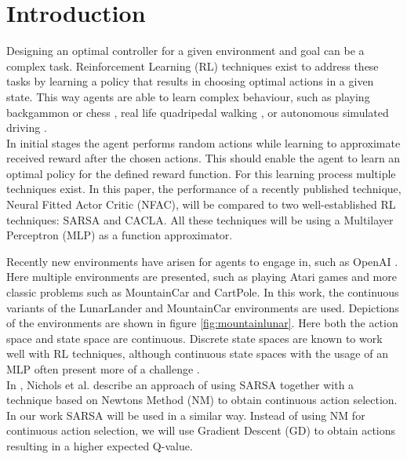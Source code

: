 
\section{Introduction}

Designing an optimal controller for a given environment and goal can be a complex task. Reinforcement Learning (RL) techniques exist to address these tasks by learning a policy that results in choosing optimal actions in a given state. This way agents are able to learn complex behaviour, such as playing backgammon \cite{tesauro2002programming} or chess \cite{baxter1999knightcap},
real life quadripedal walking \cite{kohl2004policy}, or autonomous simulated driving \cite{}. \\  %


In initial stages the agent performs random actions while learning to approximate received reward after the chosen actions. This should enable the agent to learn an optimal policy for the defined reward function. For this learning process multiple techniques exist. In this paper, the performance of a recently published technique, Neural Fitted Actor Critic (NFAC), will be compared to two well-established RL techniques: SARSA and CACLA. All these techniques will be using a Multilayer Perceptron (MLP) as a function approximator.

Recently new environments have arisen for agents to engage in, such as OpenAI \cite{openaigym}. Here multiple environments are presented, such as playing Atari games and more classic problems such as MountainCar and CartPole. In this work, the continuous variants of the LunarLander and MountainCar environments are used. Depictions of the environments are shown in figure \ref{fig:mountainlunar}. Here both the action space and state space are continuous.  Discrete state spaces are known to work well with RL techniques, although continuous state spaces with the usage of an MLP often present more of a challenge \cite{cetina2008multilayer}. \\

In \cite{nichols2015continuous}, Nichols et al. describe an approach of using SARSA together with a technique based on Newtons Method (NM) to obtain continuous action selection. In our work SARSA will be used in a similar way. Instead of using NM for continuous action selection, we will use Gradient Descent (GD) to obtain actions resulting in a higher expected Q-value.

